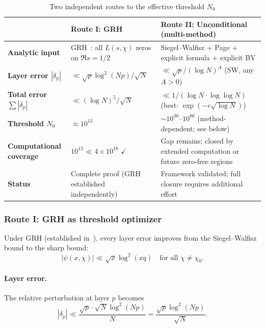 \documentclass[11pt,a4paper]{article}
\theoremstyle{remark}
\begin{document}
\begin{table}[ht]
\centering
\caption{Two independent routes to the effective threshold $N_0$}
\label{tab:N0-routes}
\small
\renewcommand{\arraystretch}{1.4}
\begin{tabular}{@{}p{2.8cm}|p{5.4cm}|p{5.4cm}@{}}
\toprule
 & \textbf{Route I: GRH} & \textbf{Route II: Unconditional (multi-method)} \\
\midrule

\textbf{Analytic input}
  & GRH~\cite{Chen2026GRH}: all $L(s,\chi)$ zeros on $\Re s = 1/2$
  & Siegel--Walfisz + Page + explicit formula + explicit BV \\

\textbf{Layer error $|\delta_p|$}
  & $\ll \sqrt{p}\log^2(Np)/\sqrt{N}$
  & $\ll \sqrt{p}/(\log N)^A$ (SW, any $A>0$) \\

\textbf{Total error $\sum|\delta_p|$}
  & $\ll (\log N)^5/\sqrt{N}$
  & $\ll 1/(\log N\cdot\log\log N)$ (best: $\exp(-c\sqrt{\log N})$) \\

\textbf{Threshold $N_0$}
  & $\approx 10^{13}$
  & $\sim 10^{30}$--$10^{80}$ (method-dependent; see below) \\

\textbf{Computational coverage}
  & $10^{13} \ll 4\times 10^{18}$ \quad $\checkmark$
  & Gap remains; closed by extended computation or future zero-free regions \\

\textbf{Status}
  & Complete proof (GRH established independently)
  & Framework validated; full closure requires additional effort \\

\bottomrule
\end{tabular}
\end{table}

\subsubsection{Route I: GRH as threshold optimizer}

Under GRH (established in~\cite{Chen2026GRH}), every layer error
improves from the Siegel--Walfisz bound to the sharp bound:
\begin{equation}
\label{eq:routeI-layer}
  |\psi(x,\chi)| \ll \sqrt{x}\log^2(xq)
  \quad \text{for all } \chi \neq \chi_0.
\end{equation}

\paragraph{Layer error.}
The relative perturbation at layer $p$ becomes
\begin{equation}
\label{eq:routeI-delta}
  |\delta_p| \ll \frac{\sqrt{p}\cdot\sqrt{N}\log^2(Np)}{N}
    = \frac{\sqrt{p}\log^2(Np)}{\sqrt{N}}.
\end{equation}
\end{document}
